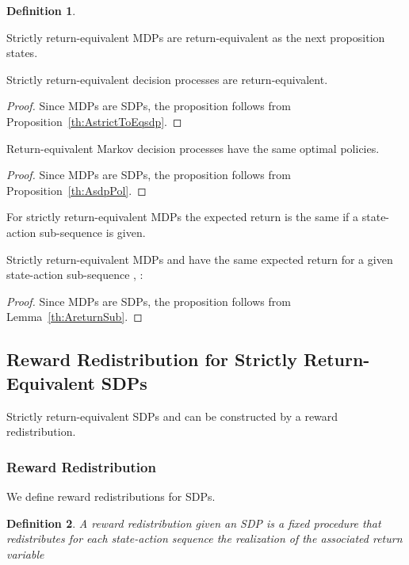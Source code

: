 \documentclass{article}
\newtheorem{definitionA}{Definition}
\begin{document}
\begin{appendices}
\begin{definitionA}
\end{definitionA}

Strictly return-equivalent MDPs are return-equivalent as the
next proposition states.
\begin{propositionA}
\label{th:AstrictToEq}
  Strictly return-equivalent decision processes are return-equivalent.
\end{propositionA}
\begin{proof}
Since MDPs are SDPs, the proposition follows from Proposition~\ref{th:AstrictToEqsdp}.
\end{proof}

\begin{propositionA}
\label{th:AthRE}
  Return-equivalent Markov decision processes have the same optimal policies.
\end{propositionA}
\begin{proof}
Since MDPs are SDPs, the proposition follows from Proposition~\ref{th:AsdpPol}.
\end{proof}



For strictly return-equivalent MDPs the expected return is the same if 
a state-action sub-sequence is given. 
\begin{propositionA}
\label{th:AstrictSub}
Strictly return-equivalent MDPs  and 
have the same expected return for a given state-action sub-sequence
, :

\end{propositionA}
\begin{proof}
Since MDPs are SDPs, the proposition follows from Lemma~\ref{th:AreturnSub}.
\end{proof}


\subsection{Reward Redistribution for Strictly Return-Equivalent SDPs}
\label{sec:rewardRedist}

Strictly return-equivalent SDPs  and 
can be constructed by a reward redistribution.

\subsubsection{Reward Redistribution}

We define reward redistributions for SDPs.
\begin{definitionA}
A {\em reward redistribution} given an SDP  
is a fixed procedure that redistributes 
for each state-action sequence  the realization of 
the associated return variable 
 

\end{definitionA}
\end{appendices}
\end{document}
